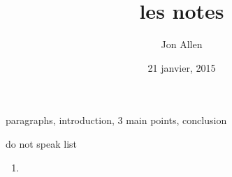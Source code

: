 \documentclass[letterpaper]{article}
\begin{document}
\title{les notes}
\date{21 janvier, 2015}
\author{Jon Allen}
 paragraphs, introduction, 3 main points, conclusion

do not speak list
\begin{enumerate}
\item

\end{enumerate}
\end{document}
